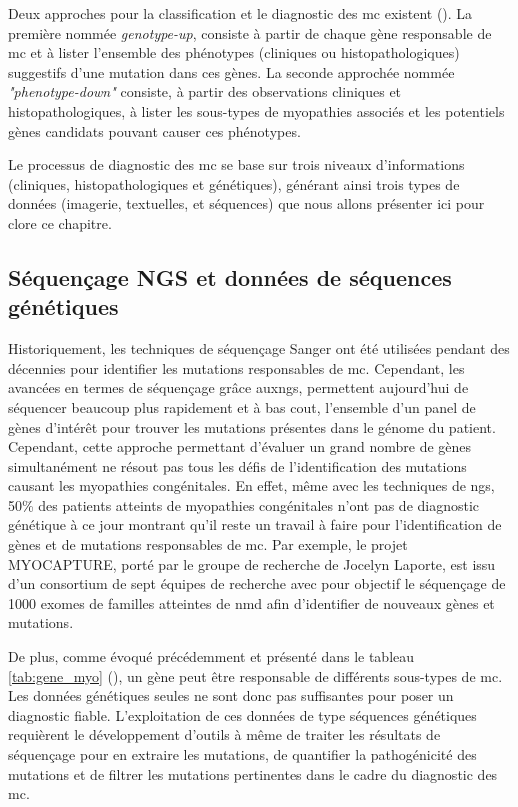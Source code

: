 Deux approches pour la classification et le diagnostic des \gls{mc} existent (\cite{north_approach_2014}). La première nommée \textit{genotype-up}, consiste à partir de chaque gène responsable de \gls{mc} et à lister l'ensemble des phénotypes (cliniques ou histopathologiques) suggestifs d'une mutation dans ces gènes. La seconde approchée nommée \textit{"phenotype-down"} consiste, à partir des observations cliniques et histopathologiques, à lister les sous-types de myopathies associés et les potentiels gènes candidats pouvant causer ces phénotypes.

Le processus de diagnostic des \gls{mc} se base sur trois niveaux d'informations (cliniques, histopathologiques et génétiques), générant ainsi trois types de données (imagerie, textuelles, et séquences) que nous allons présenter ici pour clore ce chapitre.

\subsection{Séquençage NGS et données de séquences génétiques}
Historiquement, les techniques de séquençage Sanger ont été utilisées pendant des décennies pour identifier les mutations responsables de \gls{mc}. Cependant, les avancées en termes de séquençage grâce aux\gls{ngs}, permettent aujourd'hui de séquencer beaucoup plus rapidement et à bas cout, l'ensemble d'un panel de gènes d'intérêt pour trouver les mutations présentes dans le génome du patient. Cependant, cette approche permettant d'évaluer un grand nombre de gènes simultanément ne résout pas tous les défis de l'identification des mutations causant les myopathies congénitales. En effet, même avec les techniques de \gls{ngs}, 50\% des patients atteints de myopathies congénitales n'ont pas de diagnostic génétique à ce jour montrant qu'il reste un travail à faire pour l'identification de gènes et de mutations responsables de \gls{mc}. Par exemple, le projet MYOCAPTURE, porté par le groupe de recherche de Jocelyn Laporte, est issu d'un consortium de sept équipes de recherche avec pour objectif le séquençage de 1000 exomes de familles atteintes de \gls{nmd} afin d'identifier de nouveaux gènes et mutations.

De plus, comme évoqué précédemment et présenté dans le tableau \ref{tab:gene_myo} (\cite{cassandrini_congenital_2017}), un gène peut être responsable de différents sous-types de \gls{mc}. Les données génétiques seules ne sont donc pas suffisantes pour poser un diagnostic fiable. L'exploitation de ces données de type séquences génétiques requièrent le développement d'outils à même de traiter les résultats de séquençage pour en extraire les mutations, de quantifier la pathogénicité des mutations et de filtrer les mutations pertinentes dans le cadre du diagnostic des \gls{mc}. 

